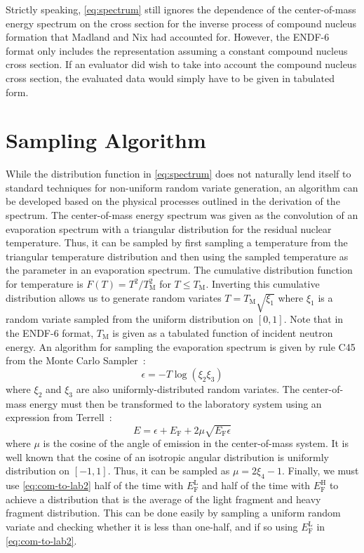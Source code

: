 \documentclass[final,leqno,onefignum,onetabnum]{siamltex1213}
\newcommand{\tmax}{T_{\mathrm{M}}}
\newcommand{\ef}{E_{\mathrm{F}}}
\newcommand{\efl}{E_{\mathrm{F}}^{\mathrm{L}}}
\newcommand{\efh}{E_{\mathrm{F}}^{\mathrm{H}}}
\begin{document}
Strictly speaking, \eqref{eq:spectrum} still ignores the dependence of the
center-of-mass energy spectrum on the cross section for the inverse process of
compound nucleus formation that Madland and Nix had accounted for. However, the
ENDF-6 format only includes the representation assuming a constant compound
nucleus cross section. If an evaluator did wish to take into account the
compound nucleus cross section, the evaluated data would simply have to be given
in tabulated form.

\section{Sampling Algorithm}

While the distribution function in \eqref{eq:spectrum} does not naturally lend
itself to standard techniques for non-uniform random variate generation, an
algorithm can be developed based on the physical processes outlined in the
derivation of the spectrum. The center-of-mass energy spectrum was given as the
convolution of an evaporation spectrum with a triangular distribution for the
residual nuclear temperature. Thus, it can be sampled by first sampling a
temperature from the triangular temperature distribution and then using the
sampled temperature as the parameter in an evaporation spectrum. The cumulative
distribution function for temperature is $F(T) = T^2/\tmax^2$ for $T \le
\tmax$. Inverting this cumulative distribution allows us to generate random
variates $T = \tmax \sqrt{\xi_1}$ where $\xi_1$ is a random variate sampled from
the uniform distribution on $[0,1]$. Note that in the ENDF-6 format, $\tmax$ is
given as a tabulated function of incident neutron energy. An algorithm for
sampling the evaporation spectrum is given by rule C45 from the Monte Carlo
Sampler~\cite{lanl-everett-1983}:
\begin{equation*}
  \epsilon = -T \log (\xi_2 \xi_3)
\end{equation*}
where $\xi_2$ and $\xi_3$ are also uniformly-distributed random variates. The
center-of-mass energy must then be transformed to the laboratory system using an
expression from Terrell~\cite{physrev-terrell-1959}:
\begin{equation}
  E = \epsilon + \ef + 2\mu \sqrt{\ef \epsilon}
  \label{eq:com-to-lab2}
\end{equation}
where $\mu$ is the cosine of the angle of emission in the center-of-mass
system. It is well known that the cosine of an isotropic angular distribution is
uniformly distribution on $[-1,1]$. Thus, it can be sampled as $\mu = 2\xi_4 -
1$. Finally, we must use \eqref{eq:com-to-lab2} half of the time with $\efl$ and
half of the time with $\efh$ to achieve a distribution that is the average of
the light fragment and heavy fragment distribution. This can be done easily by
sampling a uniform random variate and checking whether it is less than one-half,
and if so using $\efl$ in \eqref{eq:com-to-lab2}.
\end{document}
